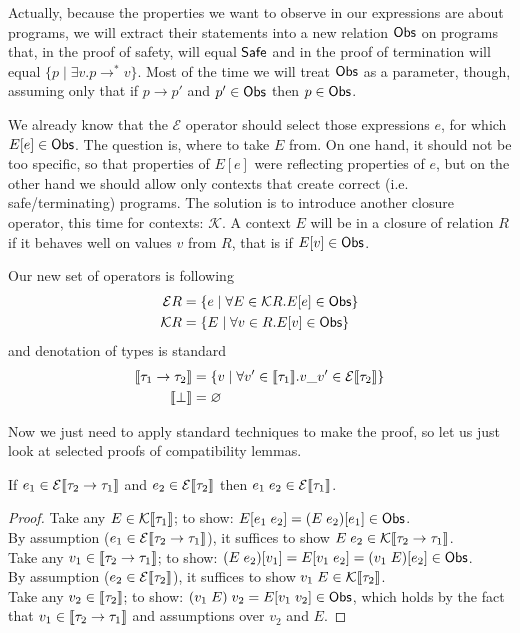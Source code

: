 Actually, because the properties we want to observe in our expressions are about
programs, we will extract their statements into a new relation $\mathsf{Obs}$ on programs
that, in the proof of safety, will equal $\mathsf{Safe}$ and in the proof of
termination will equal $\{ p \mid \exists v. p \longrightarrow^* v\}$. Most of
the time we will treat $\mathsf{Obs}$ as a parameter, though, assuming only that if
$p \longrightarrow p'$ and $p' \in \mathsf{Obs}$ then $p \in \mathsf{Obs}$.

We already know that the $\mathcal{E}$ operator should select those expressions $e$,
for which $E[e] \in \mathsf{Obs}$. The question is, where to take $E$ from. On one hand,
it should not be too specific, so that properties of $E[e]$ were reflecting
properties of $e$, but on the other hand we should allow only contexts that
create correct (i.e. safe/terminating) programs. The solution is to introduce
another closure operator, this time for contexts: $\mathcal{K}$. A context $E$
will be in a closure of relation $R$ if it behaves well on values $v$ from $R$,
that is if $E[v] \in \mathsf{Obs}$.

Our new set of operators is following
\begin{alignat*}{2}
  \mathcal{E}R &= \{ e \mid \forall E \in \mathcal{K} R. E[e] \in \mathsf{Obs} \} \\
  \mathcal{K}R &= \{ E \mid \forall v \in R. E[v] \in \mathsf{Obs} \}
\end{alignat*}
and denotation of types is standard
\begin{alignat*}{2}
  \llbracket\tau_1 \to \tau_2\rrbracket &= \{ v \mid \forall v' \in \llbracket\tau_1\rrbracket. v\_v' \in \mathcal{E}\llbracket\tau_2\rrbracket \} \\
  \llbracket\bot\rrbracket &= \varnothing
\end{alignat*}

Now we just need to apply standard techniques to make the proof, so let us just
look at selected proofs of compatibility lemmas.
\begin{lemma}
  If $e_1 \in \mathcal{E}\llbracket\tau_2 \to \tau_1\rrbracket$
  and $e_2 \in \mathcal{E}\llbracket\tau_2\rrbracket$
  then $e_1\;e_2 \in \mathcal{E}\llbracket\tau_1\rrbracket$.
\end{lemma}
\begin{proof}
  Take any $E \in \mathcal{K}\llbracket\tau_1\rrbracket$;
    to show: $E[e_1\;e_2] = (E\;e_2)[e_1] \in \mathsf{Obs}$. \\
  By assumption ($e_1 \in \mathcal{E}\llbracket\tau_2 \to \tau_1\rrbracket$),
    it suffices to show $E\;e_2 \in \mathcal{K}\llbracket\tau_2 \to \tau_1\rrbracket$. \\
  Take any $v_1 \in \llbracket\tau_2 \to \tau_1\rrbracket$;
    to show: $(E\;e_2)[v_1] = E[v_1\;e_2] = (v_1\;E)[e_2] \in \mathsf{Obs}$. \\
  By assumption ($e_2 \in \mathcal{E}\llbracket\tau_2\rrbracket$),
    it suffices to show $v_1\;E\in\mathcal{K}\llbracket\tau_2\rrbracket$. \\
  Take any $v_2 \in \llbracket\tau_2\rrbracket$;
    to show: $(v_1\;E)\;v_2 = E[v_1\;v_2] \in \mathsf{Obs}$, which holds
    by the fact that $v_1\in\llbracket\tau_2\to\tau_1\rrbracket$
    and assumptions over $v_2$ and $E$.
\end{proof}



